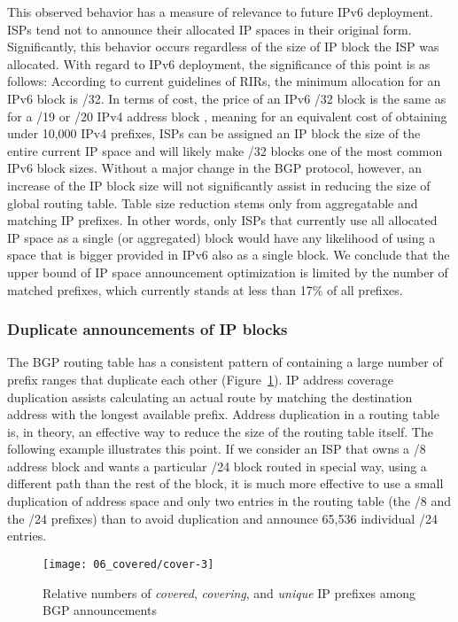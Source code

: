 This observed behavior has a measure of relevance to future IPv6 deployment.
ISPs tend not to announce their allocated IP spaces in their original form.
Significantly, this behavior occurs regardless of the size of IP block the ISP
was allocated.  With regard to IPv6 deployment, the significance of this point
is as follows: According to current guidelines of RIRs, the minimum allocation
for an IPv6 block is /32\cite{APNIC:2009:IPv6-Address}.  In terms of cost, the
price of an IPv6 /32 block is the same as for a /19 or /20 IPv4 address block
\cite{ARIN:2009:Annual-Fee-Scedule}, meaning for an equivalent cost of
obtaining under 10,000 IPv4 prefixes, ISPs can be assigned an IP block the size
of the entire current IP space and will likely make /32 blocks one of the most
common IPv6 block sizes. Without a major change in the BGP protocol, however,
an increase of the IP block size will not significantly assist in reducing the
size of global routing table. Table size reduction stems only from aggregatable
and matching IP prefixes.  In other words, only ISPs that currently use all
allocated IP space as a single (or aggregated) block would have any likelihood
of using a space that is bigger provided in IPv6 also as a single block. We
conclude that the upper bound of IP space announcement optimization is limited
by the number of matched prefixes, which currently stands at less than 17\% of
all prefixes.

\subsubsection{Duplicate announcements of IP blocks}

The BGP routing table has a consistent pattern of containing a large number of
prefix ranges that duplicate each other (Figure~\ref{fig:covered}). IP address
coverage duplication assists calculating an actual route by matching the
destination address with the longest available prefix.  Address duplication in
a routing table is, in theory, an effective way to reduce the size of the
routing table itself. The following example illustrates this point. If we
consider an ISP that owns a /8 address block and wants a particular /24 block
routed in special way, using a different path than the rest of the block, it is
much more effective to use a small duplication of address space and only two
entries in the routing table (the /8 and the /24 prefixes) than to avoid
duplication and announce 65,536 individual /24 entries.

\begin{figure}[htbp]
	\centering
		\texttt{[image: 06\_covered/cover-3]}
	\caption{Relative numbers of \emph{covered}, \emph{covering}, and \emph{unique} IP prefixes among BGP announcements}
	\label{fig:covered}
\end{figure}


